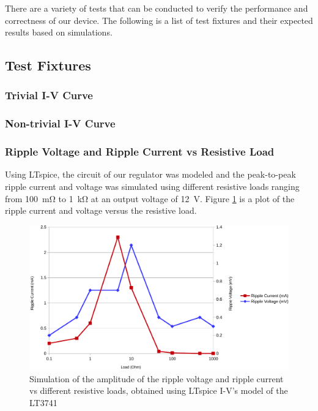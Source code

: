 There are a variety of tests that can be conducted to verify the performance and
correctness of our  device.  The  following is a list of test fixtures and their
expected results based on simulations.

\subsection{Test Fixtures}

\subsubsection{Trivial I-V Curve}


\subsubsection{Non-trivial I-V Curve}


\subsubsection{Ripple Voltage and Ripple Current vs Resistive Load}

Using LTspice\cite{ref:ltspice}, the circuit  of  our  regulator was modeled and
the  peak-to-peak  ripple  current  and  voltage  was  simulated using different
resistive  loads ranging from \SI{100}{\milli\ohm} to  \SI{1}{\kilo\ohm}  at  an
output  voltage of \SI{12}{\volt}. Figure \ref{fig:verification:ripple_sim} is a
plot  of  the   ripple   current   and   voltage   versus  the  resistive  load.

\begin{figure}[th!]
    \centering
    \includegraphics[width=.7\textwidth]{images/sim/ripple-vs-load.pdf}
    \caption{Simulation of the amplitude of the ripple voltage and ripple current vs different resistive loads, obtained using LTspice I-V's model of the LT3741}
    \label{fig:verification:ripple_sim}
\end{figure}

